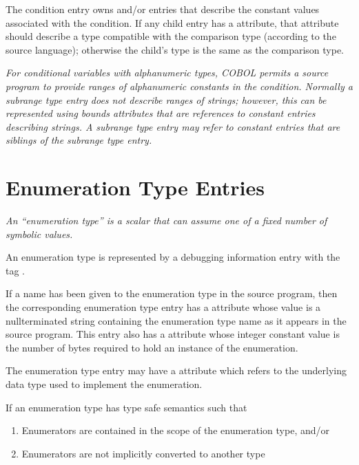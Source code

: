 The condition entry owns  and/or
 entries that describe the constant
values associated with the condition. If any child entry has
a  attribute, that attribute should describe a type
compatible with the comparison type (according to the source
language); otherwise the child’s type is the same as the
comparison type.

\textit{For conditional variables with alphanumeric types, COBOL
permits a source program to provide ranges of alphanumeric
constants in the condition. Normally a subrange type entry
does not describe ranges of strings; however, this can be
represented using bounds attributes that are references to
constant entries describing strings. A subrange type entry may
refer to constant entries that are siblings of the subrange
type entry.}


\section{Enumeration Type Entries}
\label{chap:enumerationtypeentries}

\textit{An “enumeration type” is a scalar that can assume one of
a fixed number of symbolic values.}

An enumeration type is represented by a debugging information
entry with the tag 
.

If a name has been given to the enumeration type in the source
program, then the corresponding enumeration type entry has
a  attribute whose value is a null\dash terminated
string containing the enumeration type name as it appears
in the source program. This entry also has a 
attribute whose integer constant value is the number of bytes
required to hold an instance of the enumeration.

The enumeration type entry may have a  attribute
which refers to the underlying data type used to implement
the enumeration.

If an enumeration type has type safe semantics such that

\begin{enumerate}[1.]
\item Enumerators are contained in the scope of the enumeration type, and/or

\item Enumerators are not implicitly converted to another type
\end{enumerate}

